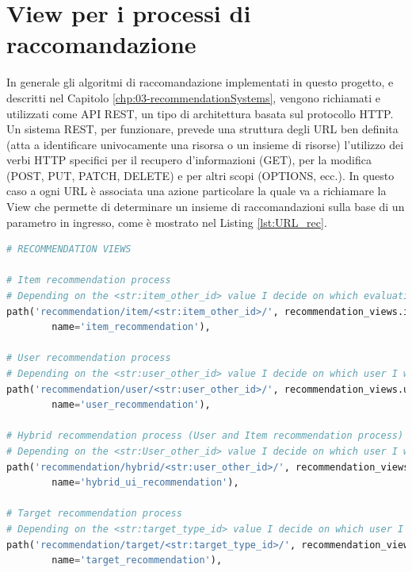 \section*{View per i processi di raccomandazione}
In generale gli algoritmi di raccomandazione implementati in questo progetto, e descritti nel Capitolo \ref{chp:03-recommendationSystems}, 
vengono richiamati e utilizzati come API REST, un tipo di architettura basata sul protocollo HTTP. Un sistema REST, per funzionare, prevede 
una struttura degli URL ben definita (atta a identificare univocamente una risorsa o un insieme di risorse) l'utilizzo dei verbi HTTP specifici 
per il recupero d'informazioni (GET), per la modifica (POST, PUT, PATCH, DELETE) e per altri scopi (OPTIONS, ecc.).\hfill\break
In questo caso a ogni URL è associata una azione particolare la quale va a richiamare la View che permette di determinare un insieme di 
raccomandazioni sulla base di un parametro in ingresso, come è mostrato nel Listing \ref{lst:URL_rec}.\hfill\break
\lstset{style=python_code_style}
\begin{lstlisting}[language=Python, label=lst:URL_rec, caption={Porzione parziale del codice contenuto nell'URL mapper per implementare
    i sistemi di raccomandazione.}]
# RECOMMENDATION VIEWS
 
# Item recommendation process
# Depending on the <str:item_other_id> value I decide on which evaluation of the taxonomy I want to recommend on
path('recommendation/item/<str:item_other_id>/', recommendation_views.item_recommendation,
        name='item_recommendation'),
 
# User recommendation process
# Depending on the <str:user_other_id> value I decide on which user I want to recommend on
path('recommendation/user/<str:user_other_id>/', recommendation_views.user_recommendation,
        name='user_recommendation'),
 
# Hybrid recommendation process (User and Item recommendation process)
# Depending on the <str:User_other_id> value I decide on which user I want to recommend on with an hybrid approach
path('recommendation/hybrid/<str:user_other_id>/', recommendation_views.hybrid_recommendation,
        name='hybrid_ui_recommendation'),
 
# Target recommendation process
# Depending on the <str:target_type_id> value I decide on which user I want to recommend on
path('recommendation/target/<str:target_type_id>/', recommendation_views.target_recommendation,
        name='target_recommendation'),
\end{lstlisting}
